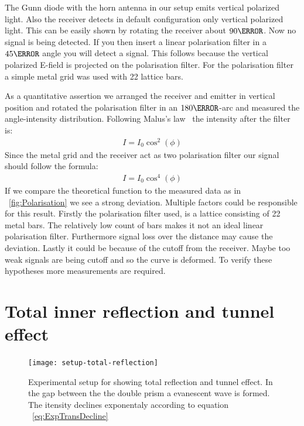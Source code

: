 \documentclass[a4paper,10pt,twocolumn]{article}
\begin{document}
    The Gunn diode with the horn antenna in our setup emits vertical polarized light.
    Also the receiver detects in default configuration only vertical polarized light.
    This can be easily shown by rotating the receiver about $ 90\degree$.
    Now no signal is being detected.
    If you then insert a linear polarisation filter in a $ 45\degree$ angle you will detect a signal.
    This follows because the vertical polarized E-field is projected on the polarisation filter.
    For the polarisation filter a simple metal grid was used with 22 lattice bars.

    As a quantitative assertion we arranged the receiver and emitter in vertical position and rotated the polarisation
    filter in an $ 180\degree $-arc and measured the angle-intensity distribution.
    Following Malus's law~\cite{gerth} the intensity after the filter is:
    \begin{align}
        I = I_0 \cos^2(\phi)
    \end{align}
    Since the metal grid and the receiver act as two polarisation filter our signal should follow the formula:
    \begin{align}
        \label{eq:cos4}
        I = I_0 \cos^4( \phi )
    \end{align}
    If we compare the theoretical function to the measured data as in ~\ref{fig:Polarisation} we see a strong deviation.
    Multiple factors could be responsible for this result.
    Firstly the polarisation filter used, is a lattice consisting of 22 metal bars. 
    The relatively low count of bars makes it not an ideal linear polarisation filter.
    Furthermore signal loss over the distance may cause the deviation.
    Lastly it could be because of the cutoff from the receiver.
    Maybe too weak signals are being cutoff and so the curve is deformed.
    To verify these hypotheses more measurements are required.
    
    \section{Total inner reflection and tunnel effect}
    
    \begin{figure}[htbp]
        \texttt{[image: setup-total-reflection]}
        \centering
        \caption{Experimental setup for showing total reflection and tunnel effect.
        In the gap between the the double prism a evanescent wave is formed.
        The itensity declines exponentaly according to equation ~\eqref{eq:ExpTransDecline}}
        \label{fig:SetupTotalReflection}
    \end{figure}
\end{document}
